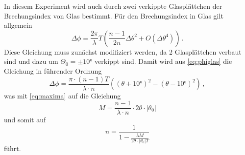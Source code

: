 In diesem Experiment wird auch durch zwei verkippte Glasplättchen der Brechungsindex von Glas bestimmt.
Für den Brechungsindex in Glas gilt allgemein \cite{v64}
\begin{equation}\label{eq:phiglas}
    \Delta \phi = \frac{2\pi}{\lambda}T\left(\frac{n-1}{2n}\Delta \theta^2+O( \Delta \theta^4)\right) \, .
\end{equation}
Diese Gleichung muss zunächst modifiziert werden, da 2 Glasplättchen verbaut sind und dazu um $\Theta_0 = \pm 10°$ verkippt sind.
Damit wird aus \autoref{eq:phiglas} die Gleichung in führender Ordnung
\begin{equation}
    \Delta \phi = \frac{\pi \cdot (n - 1) T}{\lambda \cdot n} \left(\left( \theta + 10° \right)^2 - \left( \theta - 10° \right)^2\right) \, ,
\end{equation}
was mit \autoref{eq:maxima} auf die Gleichung
\begin{equation*}
    M = \frac{n - 1}{\lambda \cdot n} \cdot 2 \theta \cdot |\theta_0|
\end{equation*}
und somit auf
\begin{equation} \label{eq:n_Glas}
    n = \frac{1}{1- \frac{\lambda M}{ 2 \theta \cdot |\theta_0| T}}
\end{equation}
führt.

